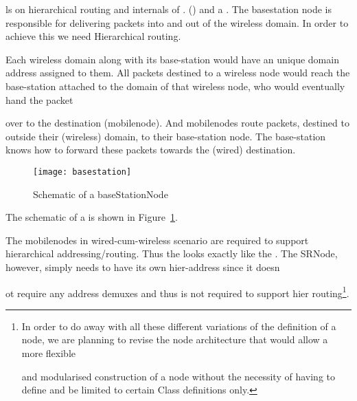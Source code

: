 {{ls on hierarchical routing and internals of .} () and a . The basestation node is responsible for delivering packets into and out of the wireless domain. In order to achieve this we need Hierarchical routing.









 Each wireless domain along with its base-station would have an unique domain address assigned to them. All packets destined to a wireless node would reach the base-station attached to the domain of that wireless node, who would eventually hand the packet









 over to the destination (mobilenode). And mobilenodes route packets, destined to outside their (wireless) domain, to their base-station node. The base-station knows how to forward these packets towards the (wired) destination. 
\begin{figure}
    \centerline{\texttt{[image: basestation]}}
    \caption{Schematic of a baseStationNode}
    \label{fig:mobilenode-basestation}
\end{figure}
The schematic of a  is shown in Figure~\ref{fig:mobilenode-basestation}.

The mobilenodes in wired-cum-wireless scenario are required to support hierarchical addressing/routing. Thus the  looks exactly like the . The SRNode, however, simply needs to have its own hier-address since it doesn









ot require any address demuxes and thus is not required to support hier routing\footnote{In order to do away with all these different variations of the definition of a node, we are planning to revise the node architecture that would allow a more flexible 









and modularised construction of a node without the necessity of having to define and be limited to certain Class definitions only.}.

}
